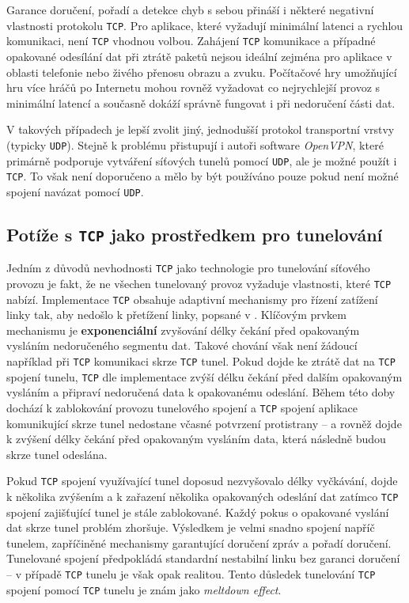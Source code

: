 \documentclass[thesis=M,czech]{FITthesis}[2012/10/20]
\begin{document}
    Garance doručení, pořadí a detekce chyb s sebou přináší i některé negativní vlastnosti protokolu \texttt{TCP}. Pro aplikace, které vyžadují minimální latenci a rychlou komunikaci, není \texttt{TCP} vhodnou volbou. Zahájení \texttt{TCP} komunikace a případné opakované odesílání dat při ztrátě paketů nejsou ideální zejména pro aplikace v oblasti telefonie nebo živého přenosu obrazu a zvuku. Počítačové hry umožňující hru více hráčů po Internetu mohou rovněž vyžadovat co nejrychlejší provoz s minimální latencí a současně dokáží správně fungovat i při nedoručení části dat.
    
    V takových případech je lepší zvolit jiný, jednodušší protokol transportní vrstvy (typicky \texttt{UDP}). Stejně k problému přistupují i autoři software \textit{OpenVPN}, které primárně podporuje vytváření síťových tunelů pomocí \texttt{UDP}, ale je možné použít i \texttt{TCP}. To však není doporučeno a mělo by být používáno pouze pokud není možné spojení navázat pomocí \texttt{UDP}.
    
    \subsection{Potíže s \texttt{TCP} jako prostředkem pro tunelování}
    \label{subsec:tcp-tunnel-issues}
    
    Jedním z důvodů nevhodnosti \texttt{TCP} jako technologie pro tunelování síťového provozu je fakt, že ne všechen tunelovaný provoz vyžaduje vlastnosti, které \texttt{TCP} nabízí. Implementace \texttt{TCP} obsahuje adaptivní mechanismy pro řízení zatížení linky tak, aby nedošlo k přetížení linky, popsané v \cite[RFC 2001]{rfc2001}. Klíčovým prvkem mechanismu je \textbf{exponenciální} zvyšování délky čekání před opakovaným vysláním nedoručeného segmentu dat. Takové chování však není žádoucí například při \texttt{TCP} komunikaci skrze \texttt{TCP} tunel. Pokud dojde ke ztrátě dat na \texttt{TCP} spojení tunelu, \texttt{TCP} dle implementace zvýší délku čekání před dalším opakovaným vysláním a připraví nedoručená data k opakovanému odeslání. Během této doby dochází k zablokování provozu tunelového spojení a \texttt{TCP} spojení aplikace komunikující skrze tunel nedostane včasné potvrzení protistrany -- a rovněž dojde k zvýšení délky čekání před opakovaným vysláním data, která následně budou skrze tunel odeslána.
    
    Pokud \texttt{TCP} spojení využívající tunel doposud nezvyšovalo délky vyčkávání, dojde k několika zvýšením a k zařazení několika opakovaných odeslání dat zatímco \texttt{TCP} spojení zajišťující tunel je stále zablokované. Každý pokus o opakované vyslání dat skrze tunel problém zhoršuje. Výsledkem je velmi snadno  spojení napříč tunelem, zapříčiněné mechanismy garantující doručení zpráv a pořadí doručení. Tunelované spojení předpokládá standardní nestabilní linku bez garanci doručení -- v případě \texttt{TCP} tunelu je však opak realitou. Tento důsledek tunelování \texttt{TCP} spojení pomocí \texttt{TCP} tunelu je znám jako \textit{meltdown effect}\cite{tcp-over-tcp}.
\end{document}
